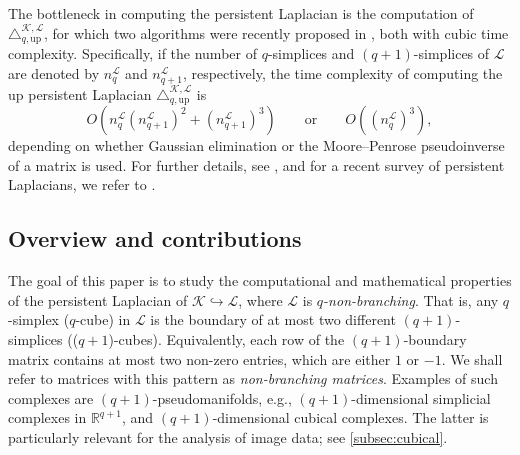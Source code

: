 \documentclass{article}
\theoremstyle{definition}
\newcommand{\KK}{\mathcal{K}}
\newcommand{\LL}{\mathcal{L}}
\begin{document}
The bottleneck in computing the persistent Laplacian is the computation of $\triangle_{q, \mathrm{up}}^{\KK, \LL}$, for which two algorithms were recently proposed in \cite{pers_lap}, both with cubic time complexity. Specifically, if the number of $q$-simplices and $(q+1)$-simplices of $\LL$ are denoted by $n_q^\LL$ and $n_{q+1}^\LL$, respectively, the time complexity of computing the up persistent Laplacian $\triangle_{q, \mathrm{up}}^{\KK, \LL}$ is
\[
O\left(n_q^\LL (n_{q+1}^\LL)^2 + (n_{q+1}^\LL)^3\right) \qquad \text{or}\qquad 
O\left( (n_q^\LL)^3 \right),
\]
depending on whether Gaussian elimination or the Moore–Penrose pseudoinverse of a matrix is used. For further details, see \cite[Algorithm 3.1, Algorithm 4.1]{pers_lap}, and for a recent survey of persistent Laplacians, we refer to \cite{wei2023}.

\subsection{Overview and contributions}
The goal of this paper is to study the computational and mathematical properties of the persistent Laplacian of $\KK\hookrightarrow \LL$, where $\LL$ is \emph{$q$-non-branching}. That is, any $q$-simplex ($q$-cube) in $\LL$ is the boundary of at most two different $(q+1)$-simplices (($q+1$)-cubes). Equivalently, each row of the $(q+1)$-boundary matrix contains at most two non-zero entries, which are either $1$ or $-1$. We shall refer to matrices with this pattern as \emph{non-branching matrices}. Examples of such complexes are $(q+1)$-pseudomanifolds, e.g., $(q+1)$-dimensional simplicial complexes in $\mathbb{R}^{q+1}$, and $(q+1)$-dimensional cubical complexes. The latter is particularly relevant for the analysis of image data; see \cref{subsec:cubical}. 

\end{document}
